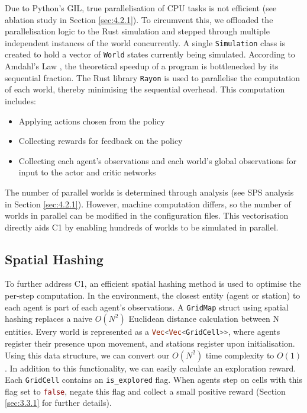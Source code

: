 Due to Python's GIL, true parallelisation of CPU tasks is not efficient (see ablation study in Section \ref{sec:4.2.1}).
To circumvent this, we offloaded the parallelisation logic to the Rust simulation and stepped through multiple independent instances of the world concurrently.
A single \lstinline[language=Rust]|Simulation| class is created to hold a vector of \lstinline[language=Rust]|World| states currently being simulated.
According to Amdahl's Law \cite{amdahl}, the theoretical speedup of a program is bottlenecked by its sequential fraction.
The Rust library \lstinline[language=Rust]|Rayon| \cite{rayon_rs} is used to parallelise the computation of each world, thereby minimising the sequential overhead.
This computation includes:
\begin{itemize}[noitemsep, topsep=0pt]
    \item Applying actions chosen from the policy
    \item Collecting rewards for feedback on the policy
    \item Collecting each agent's observations and each world's global observations for input to the actor and critic networks
\end{itemize}
The number of parallel worlds is determined through analysis (see SPS analysis in Section \ref{sec:4.2.1}).
However, machine computation differs, so the number of worlds in parallel can be modified in the configuration files.
This vectorisation directly aids C1 by enabling hundreds of worlds to be simulated in parallel.

\subsection{Spatial Hashing}
\label{sec:3.2.4}

To further address C1, an efficient spatial hashing method is used to optimise the per-step computation.
In the environment, the closest entity (agent or station) to each agent is part of each agent's observations.
A \lstinline[language=Rust]|GridMap| struct using spatial hashing replaces a naive $O(N^{2})$ Euclidean distance calculation between N entities.
Every world is represented as a \lstinline[language=Rust]|Vec<Vec<GridCell>>|, where agents register their presence upon movement, and stations register upon initialisation.
Using this data structure, we can convert our $O(N^2)$ time complexity to $O(1)$.
In addition to this functionality, we can easily calculate an exploration reward.
Each \lstinline[language=Rust]|GridCell| contains an \lstinline[language=Rust]|is_explored| flag.
When agents step on cells with this flag set to \lstinline[language=Rust]|false|, negate this flag and collect a small positive reward (Section \ref{sec:3.3.1} for further details).

